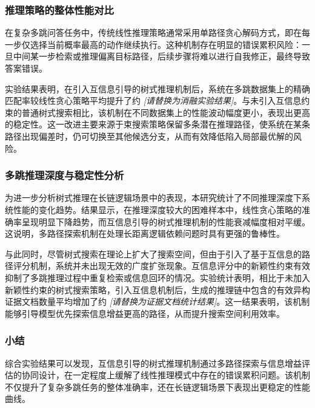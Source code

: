 \subsubsection{推理策略的整体性能对比}

在复杂多跳问答任务中，传统线性推理策略通常采用单路径贪心解码方式，即在每一步仅选择当前概率最高的动作继续执行。这种机制存在明显的错误累积风险：一旦中间某一步检索或推理偏离目标路径，后续步骤将难以进行自我修正，最终导致答案错误。

实验结果表明，在引入互信息引导的树式推理机制后，系统在多跳数据集上的精确匹配率较线性贪心策略平均提升了约 \textit{[请替换为消融实验结果]}。与未引入互信息约束的普通树式搜索相比，该机制在不同数据集上的性能波动幅度更小，表现出更高的稳定性。这一改进主要来源于束搜索策略保留多条潜在推理路径，使系统在某条路径出现偏差时，仍可切换至其他候选分支，从而有效降低陷入局部最优解的风险。


\subsubsection{多跳推理深度与稳定性分析}

为进一步分析树式推理在长链逻辑场景中的表现，本研究统计了不同推理深度下系统性能的变化趋势。结果显示，在推理深度较大的困难样本中，线性贪心策略的准确率呈现明显下降趋势，而互信息引导的树式推理机制的性能衰减幅度相对平缓。这说明，多路径探索机制在处理长距离逻辑依赖问题时具有更强的鲁棒性。

与此同时，尽管树式搜索在理论上扩大了搜索空间，但由于引入了基于互信息的路径评分机制，系统并未出现无效的广度扩张现象。互信息评分中的新颖性约束有效抑制了多跳推理过程中重复检索或信息回环的情况。实验统计表明，相比于未加入新颖性约束的树式搜索策略，引入互信息机制后，生成的推理链中包含的有效异构证据文档数量平均增加了约 \textit{[请替换为证据文档统计结果]}。这一结果表明，该机制能够引导模型优先探索信息增益更高的路径，从而提升搜索空间利用效率。


\subsubsection{小结}

综合实验结果可以发现，互信息引导的树式推理机制通过多路径探索与信息增益评估的协同设计，在一定程度上缓解了线性推理模式中存在的错误累积问题。该机制不仅提升了复杂多跳任务的整体准确率，还在长链逻辑场景下表现出更稳定的性能曲线。

